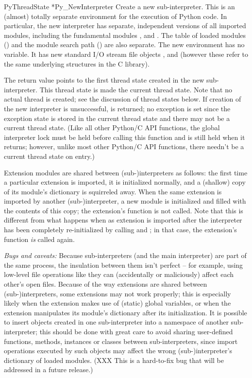 \documentclass[twoside]{report}
\begin{document}
\begin{cfuncdesc}{PyThreadState *}{Py_NewInterpreter}{}
Create a new sub-interpreter.  This is an (almost) totally separate 
environment for the execution of Python code.  In particular, the new 
interpreter has separate, independent versions of all imported 
modules, including the fundamental modules , 
 and .  The table of loaded modules 
() and the module search path () are 
also separate.  The new environment has no  variable.  
It has new standard I/O stream file objects , 
 and  (however these refer to the 
same underlying  structures in the C library).

The return value points to the first thread state created in the new 
sub-interpreter.  This thread state is made the current thread state.  
Note that no actual thread is created; see the discussion of thread 
states below.  If creation of the new interpreter is unsuccessful, 
\NULL{} is returned; no exception is set since the exception state 
is stored in the current thread state and there may not be a current 
thread state.  (Like all other Python/C API functions, the global 
interpreter lock must be held before calling this function and is 
still held when it returns; however, unlike most other Python/C API 
functions, there needn't be a current thread state on entry.)

Extension modules are shared between (sub-)interpreters as follows: 
the first time a particular extension is imported, it is initialized 
normally, and a (shallow) copy of its module's dictionary is 
squirreled away.  When the same extension is imported by another 
(sub-)interpreter, a new module is initialized and filled with the 
contents of this copy; the extension's  function is not 
called.  Note that this is different from what happens when as 
extension is imported after the interpreter has been completely 
re-initialized by calling  and 
; in that case, the extension's  
function \emph{is} called again.

\emph{Bugs and caveats:} Because sub-interpreters (and the main 
interpreter) are part of the same process, the insulation between them 
isn't perfect -- for example, using low-level file operations like 
 they can (accidentally or maliciously) affect each 
other's open files.  Because of the way extensions are shared between 
(sub-)interpreters, some extensions may not work properly; this is 
especially likely when the extension makes use of (static) global 
variables, or when the extension manipulates its module's dictionary 
after its initialization.  It is possible to insert objects created in 
one sub-interpreter into a namespace of another sub-interpreter; this 
should be done with great care to avoid sharing user-defined 
functions, methods, instances or classes between sub-interpreters, 
since import operations executed by such objects may affect the 
wrong (sub-)interpreter's dictionary of loaded modules.  (XXX This is 
a hard-to-fix bug that will be addressed in a future release.)
\end{cfuncdesc}
\end{document}
